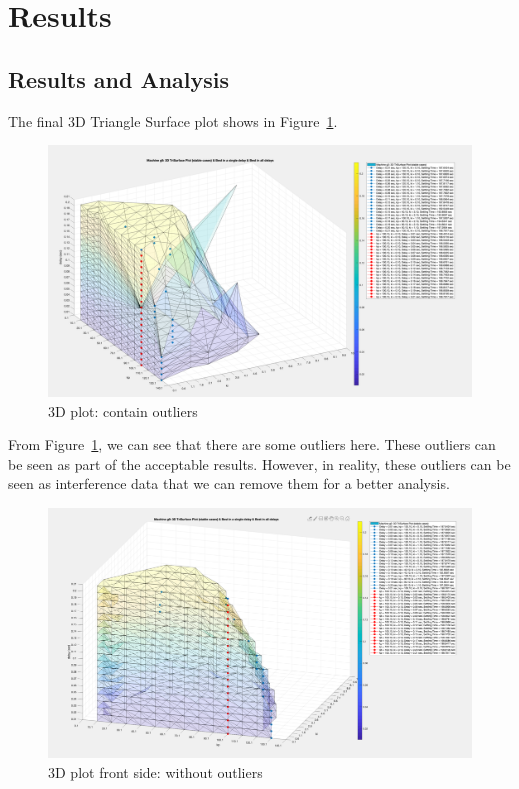 \section{Results} %
\subsection{Results and Analysis} %
The final 3D Triangle Surface plot shows in Figure~\ref{5_4_1_Outlier}. 

\begin{figure}[htbp]
\centering
\includegraphics[width = .819\textwidth]{figure/5_4_1_Outlier.png}
\caption{3D plot: contain outliers}
\label{5_4_1_Outlier}
\end{figure}

From Figure~\ref{5_4_1_Outlier}, we can see that there are some outliers here. These outliers can be seen as part of the acceptable results. However, in reality, these outliers can be seen as interference data that we can remove them for a better analysis. 

\begin{figure}[htbp]
\centering
\includegraphics[width = .819\textwidth]{figure/5_4_1_without_Outlier1.png}
\caption{3D plot front side: without outliers}
\label{5_4_1_without_Outlier1}
\end{figure}

